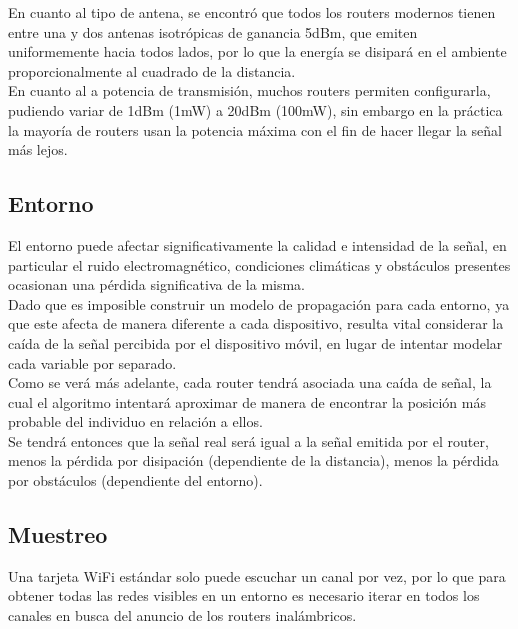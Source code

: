 \documentclass[journal]{IEEEtran}
\begin{document}
En cuanto al tipo de antena, se encontró que todos los routers modernos tienen entre una y dos antenas isotrópicas de ganancia 5dBm, que emiten uniformemente hacia todos lados, por lo que la energía se disipará en el ambiente proporcionalmente al cuadrado de la distancia.\\

En cuanto al a potencia de transmisión, muchos routers permiten configurarla, pudiendo variar de 1dBm (1mW) a 20dBm (100mW), sin embargo en la práctica la mayoría de routers usan la potencia máxima con el fin de hacer llegar la señal más lejos.\\

\subsection{Entorno}

El entorno puede afectar significativamente la calidad e intensidad de la señal, en particular el ruido electromagnético, condiciones climáticas y obstáculos presentes ocasionan una pérdida significativa de la misma.\\

Dado que es imposible construir un modelo de propagación para cada entorno, ya que este afecta de manera diferente a cada dispositivo, resulta vital considerar la caída de la señal percibida por el dispositivo móvil, en lugar de intentar modelar cada variable por separado.\\

Como se verá más adelante, cada router tendrá asociada una caída de señal, la cual el algoritmo intentará aproximar de manera de encontrar la posición más probable del individuo en relación a ellos.\\

Se tendrá entonces que la señal real será igual a la señal emitida por el router, menos la pérdida por disipación (dependiente de la distancia), menos la pérdida por obstáculos (dependiente del entorno).\\

\subsection{Muestreo}

Una tarjeta WiFi estándar solo puede escuchar un canal por vez, por lo que para obtener todas las redes visibles en un entorno es necesario iterar en todos los canales en busca del anuncio de los routers inalámbricos.\\
\end{document}
